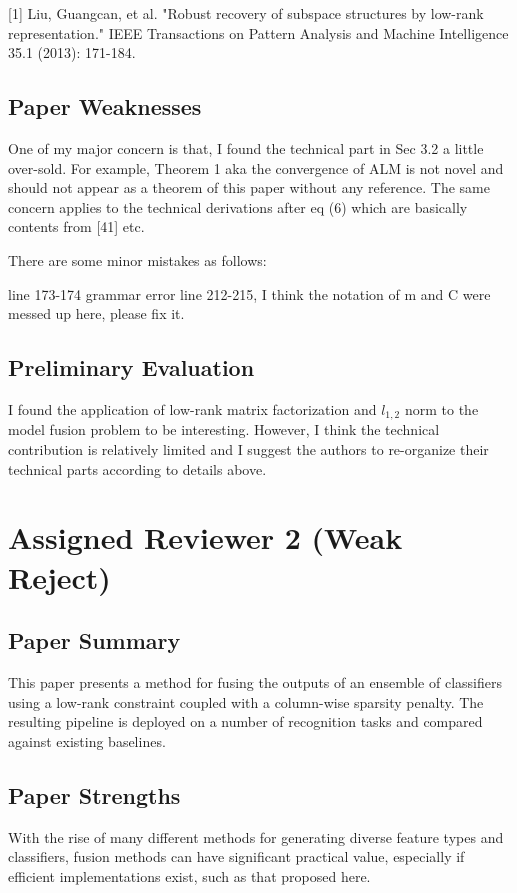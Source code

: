\documentclass[letterpaper]{article}
\begin{document}
[1] Liu, Guangcan, et al. "Robust recovery of subspace structures by low-rank representation." IEEE Transactions on Pattern Analysis and Machine Intelligence 35.1 (2013): 171-184.

\subsection{Paper Weaknesses}
One of my major concern is that, I found the technical part in Sec 3.2 a little over-sold. For example, Theorem 1 aka the convergence of ALM is not novel and should not appear as a theorem of this paper without any reference. The same concern applies to the technical derivations after eq (6) which are basically contents from [41] etc. 

There are some minor mistakes as follows:

line 173-174 grammar error
line 212-215, I think the notation of m and C were messed up here, please fix it.

\subsection{Preliminary Evaluation}
I found the application of low-rank matrix factorization and $l_{1,2}$ norm to the model fusion problem to be interesting. However, I think the technical contribution is relatively limited and I suggest the authors to re-organize their technical parts according to details above.

\section{Assigned Reviewer 2 (Weak Reject)}

\subsection{Paper Summary}
This paper presents a method for fusing the outputs of an ensemble of classifiers using a low-rank constraint coupled with a column-wise sparsity penalty. The resulting pipeline is deployed on a number of recognition tasks and compared against existing baselines.

\subsection{Paper Strengths}
With the rise of many different methods for generating diverse feature types and classifiers, fusion methods can have significant practical value, especially if efficient implementations exist, such as that proposed here.
\end{document}
